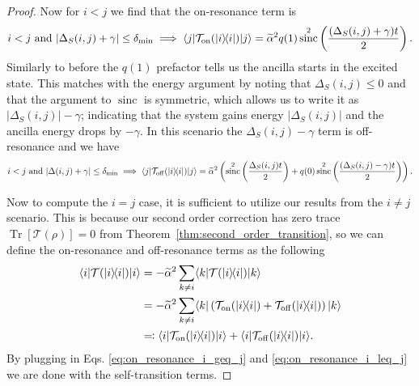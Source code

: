 \documentclass{article}
\newcommand{\on}{\rm on}
\newcommand{\off}{\rm off}
\newcommand{\ket}[1]{|#1\rangle}
\newcommand{\bra}[1]{\langle #1|}
\newcommand{\ketbra}[2]{| #1\rangle\! \langle #2|}
\newcommand{\brackets}[1]{\left[ #1 \right]}
\DeclareMathOperator{\Tr}{Tr}
\newcommand{\trace}[1]{\Tr \brackets{ #1 }}
\DeclareMathOperator{\sinc}{sinc}
\begin{document}
\begin{proof}
    Now for $i < j$ we find that the on-resonance term is 
    \begin{equation}
    i < j \text{ and } |\Delta_S(i,j) + \gamma| \le \delta_{\min} \implies \bra{j} \mathcal{T}_{\on}(\ketbra{i}{i}) \ket{j} = \widetilde{\alpha}^2 q(1) \sinc^2 \left( \frac{(\Delta_S(i,j) + \gamma)t}{2} \right). \label{eq:on_resonance_i_leq_j}
    \end{equation}
    Similarly to before the $q(1)$ prefactor tells us the ancilla starts in the excited state. This matches with the energy argument by noting that $\Delta_S(i,j) \le 0$ and that the argument to $\sinc$ is symmetric, which allows us to write it as $|\Delta_S(i,j)| - \gamma$; indicating that the system gains energy $|\Delta_S(i,j)|$ and the ancilla energy drops by $-\gamma$. In this scenario the $\Delta_S(i,j) - \gamma$ term is off-resonance and we have
    \begin{align}
        i < j \text{ and } |\Delta(i,j) + \gamma| \le \delta_{\min} \implies  \bra{j} \mathcal{T}_{\off}(\ketbra{i}{i}) \ket{j} = \widetilde{\alpha}^2\left( \sinc^2 \left( \frac{\Delta_S(i,j) t}{2} \right) + q(0) \sinc^2 \left(\frac{(\Delta_S(i,j) - \gamma) t}{2} \right) \right).
    \end{align}


    Now to compute the $i = j$ case, it is sufficient to utilize our results from the $i \neq j$ scenario. This is because our second order correction has zero trace $\trace{\mathcal{T}(\rho)} = 0$ from Theorem~\ref{thm:second_order_transition}, so we can define the on-resonance and off-resonance terms as the following
    \begin{align}
        \bra{i} \mathcal{T}(\ketbra{i}{i}) \ket{i} &= - \widetilde{\alpha}^2 \sum_{k \neq i} \bra{k} \mathcal{T}(\ketbra{i}{i}) \ket{k} \\
        &= - \widetilde{\alpha}^2 \sum_{k \neq i} \bra{k} \left( \mathcal{T}_{\on}(\ketbra{i}{i}) + \mathcal{T}_{\off}(\ketbra{i}{i}) \right) \ket{k} \\
        &\eqqcolon  \bra{i} \mathcal{T}_{\on}(\ketbra{i}{i}) \ket{i} + \bra{i} \mathcal{T}_{\off}(\ketbra{i}{i}) \ket{i}.
    \end{align}
    By plugging in Eqs. \eqref{eq:on_resonance_i_geq_j} and \eqref{eq:on_resonance_i_leq_j} we are done with the self-transition terms. 
\end{proof}
\end{document}
